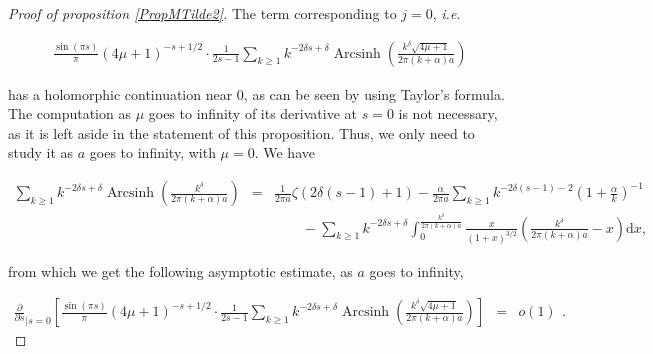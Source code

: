 \documentclass{jams-l}
\theoremstyle{definition}
\theoremstyle{remark}
\numberwithin{equation}{section}
\DeclareMathOperator{\arcsinh}{Arcsinh}
\begin{document}
\begin{proof}[Proof of proposition \ref{PropMTilde2}]
                    \noindent The term corresponding to $j=0$, \textit{i.e.}
                    
                    \[ \begin{array}{c}
                            \frac{\sin \left( \pi s \right)}{\pi} \left( 4 \mu + 1 \right)^{-s+1/2} \cdot \frac{1}{2s-1} \sum\limits_{k \geqslant 1}  k^{- 2 \delta s + \delta} \arcsinh \left( \frac{k^{\delta} \sqrt{4 \mu + 1}}{2 \pi \left( k + \alpha \right) a} \right)
                        \end{array} \]
                    
                    \noindent has a holomorphic continuation near $0$, as can be seen by using Taylor's formula. The computation as $\mu$ goes to infinity of its derivative at $s=0$ is not necessary, as it is left aside in the statement of this proposition. Thus, we only need to study it as $a$ goes to infinity, with $\mu = 0$. We have
                    
                    \[ \begin{array}{lll}
                            \scriptstyle \sum\limits_{k \geqslant 1}  k^{- 2 \delta s + \delta} \arcsinh \left( \frac{k^{\delta}}{2 \pi \left( k + \alpha \right) a} \right) & \scriptstyle = & \scriptstyle \frac{1}{2 \pi a} \zeta \left( 2 \delta \left( s - 1 \right) + 1 \right) - \frac{\alpha}{2 \pi a} \sum\limits_{k \geqslant 1} k^{- 2 \delta \left( s-1 \right) - 2} \left( 1 + \frac{\alpha}{k} \right)^{-1} \\[1em]
                            
                            && \qquad \scriptstyle - \sum\limits_{k \geqslant 1} k^{- 2 \delta s + \delta} \int_0^{\frac{k^{\delta}}{2 \pi \left( k + \alpha \right) a}} \frac{x}{\left( 1 + x \right)^{3/2}} \left( \frac{k^{\delta}}{2 \pi \left( k + \alpha \right) a} - x \right) \mathrm{d}x,
                        \end{array} \]
                    
                    \noindent from which we get the following asymptotic estimate, as $a$ goes to infinity,
                    
                    \[ \begin{array}{lll}
                            \scriptstyle \frac{\partial}{\partial s}_{\left \vert s = 0 \right.} \left[ \frac{\sin \left( \pi s \right)}{\pi} \left( 4 \mu + 1 \right)^{-s+1/2} \cdot \frac{1}{2s-1} \sum\limits_{k \geqslant 1}  k^{- 2 \delta s + \delta} \arcsinh \left( \frac{k^{\delta} \sqrt{4 \mu + 1}}{2 \pi \left( k + \alpha \right) a} \right) \right] & = & o \left( 1 \right)
                        \end{array} . \]
                    

\end{proof}
\end{document}
